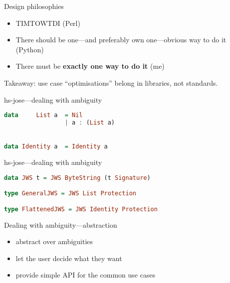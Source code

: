 \documentclass[ignorenonframetext,aspectratio=43]{beamer}
\providecommand{\tightlist}{%
  \setlength{\itemsep}{0pt}\setlength{\parskip}{0pt}}
\begin{document}
\begin{frame}{Design philosophies}
\begin{itemize}
\tightlist
\item TIMTOWTDI (Perl)
\item There should be one---and preferably own one---obvious way to do it (Python)
\item There must be {\bf exactly one way to do it} (me)
\end{itemize}
\end{frame}





\begin{frame}[plain]
\huge
Takeaway: use case ``optimisations'' belong in libraries, not standards.
\end{frame}


\begin{frame}[fragile]{hs-jose---dealing with ambiguity}
\begin{lstlisting}[language=Haskell]
data     List a  = Nil
                 | a : (List a)


data Identity a  = Identity a
\end{lstlisting}
\end{frame}

\begin{frame}[fragile]{hs-jose---dealing with ambiguity}
\begin{lstlisting}[language=Haskell]
data JWS t = JWS ByteString (t Signature)

type GeneralJWS = JWS List Protection

type FlattenedJWS = JWS Identity Protection
\end{lstlisting}
\end{frame}

\begin{frame}{Dealing with ambiguity---abstraction}
\begin{itemize}
\tightlist
\item abstract over ambiguities
\item let the user decide what they want
\item provide simple API for the common use cases
\end{itemize}
\end{frame}
\end{document}
